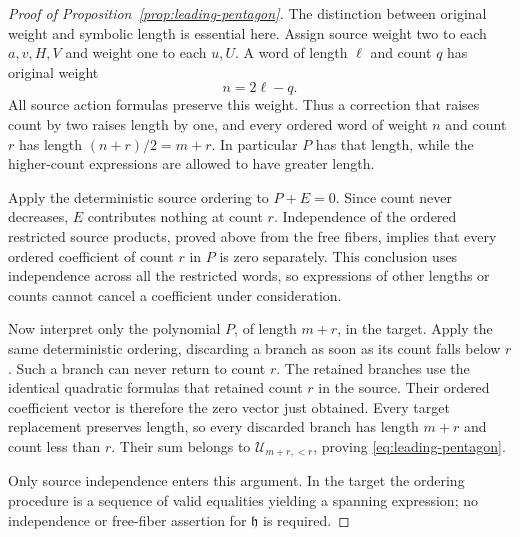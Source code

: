 \begin{proof}[Proof of Proposition~\ref{prop:leading-pentagon}]
The distinction between original weight and symbolic length is
essential here.  Assign source weight two to each $a,v,H,V$ and
weight one to each $u,U$.  A word of length $\ell$ and count $q$ has
original weight
\begin{equation}\label{eq:weight-length-count}
 n=2\ell-q.
\end{equation}
All source action formulas preserve this weight.  Thus a correction
that raises count by two raises length by one, and every ordered
word of weight $n$ and count $r$ has length
$(n+r)/2=m+r$.  In particular $P$ has that length, while the
higher-count expressions are allowed to have greater length.

Apply the deterministic source ordering to $P+E=0$.  Since count
never decreases, $E$ contributes nothing at count $r$.  Independence
of the ordered restricted source products, proved above from the
free fibers, implies that every ordered coefficient of count $r$
in $P$ is zero separately.  This conclusion uses independence
across all the restricted words, so expressions of other lengths
or counts cannot cancel a coefficient under consideration.

Now interpret only the polynomial $P$, of length $m+r$, in the
target.  Apply the same deterministic ordering, discarding a branch
as soon as its count falls below $r$.  Such a branch can never return
to count $r$.  The retained branches use the identical quadratic
formulas that retained count $r$ in the source.  Their ordered
coefficient vector is therefore the zero vector just obtained.
Every target replacement preserves length, so every discarded
branch has length $m+r$ and count less than $r$.  Their sum belongs
to $\mathcal U_{m+r,<r}$, proving \eqref{eq:leading-pentagon}.

Only source independence enters this argument.  In the target the
ordering procedure is a sequence of valid equalities yielding a
spanning expression; no independence or free-fiber assertion for
$\mathfrak h$ is required.
\end{proof}
